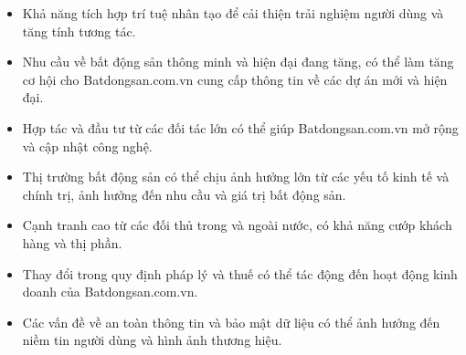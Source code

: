 \begin{tcbraster}[raster columns=2, boxrule=0mm, arc=0mm]
\begin{tcolorbox}[equal height group=B, size=fbox, colback=swotO!60, colframe=swotO!80!black, title=\textsc{opportunities}]
\begin{itemize}
\item Khả năng tích hợp trí tuệ nhân tạo để cải thiện trải nghiệm người dùng và tăng tính tương tác.
\item Nhu cầu về bất động sản thông minh và hiện đại đang tăng, có thể làm tăng cơ hội cho Batdongsan.com.vn cung cấp thông tin về các dự án mới và hiện đại.
\item Hợp tác và đầu tư từ các đối tác lớn có thể giúp Batdongsan.com.vn mở rộng và cập nhật công nghệ.
\end{itemize}
\end{tcolorbox}
\begin{tcolorbox}[equal height group=B, size=fbox, colback=swotT!60, colframe=swotT!80!black, title=\textsc{threats}]
\begin{itemize}
\item Thị trường bất động sản có thể chịu ảnh hưởng lớn từ các yếu tố kinh tế và chính trị, ảnh hưởng đến nhu cầu và giá trị bất động sản.
\item Cạnh tranh cao từ các đối thủ trong và ngoài nước, có khả năng cướp khách hàng và thị phần.
\item Thay đổi trong quy định pháp lý và thuế có thể tác động đến hoạt động kinh doanh của Batdongsan.com.vn.
\item Các vấn đề về an toàn thông tin và bảo mật dữ liệu có thể ảnh hưởng đến niềm tin người dùng và hình ảnh thương hiệu.
\end{itemize}
\end{tcolorbox}
\end{tcbraster}
